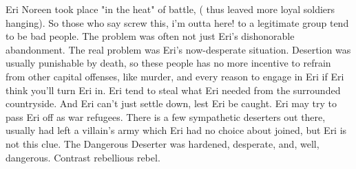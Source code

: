 \documentclass[12pt]{book}
\begin{document}
Eri Noreen took place "in the heat" of battle, ( thus leaved more loyal soldiers hanging). So those who say screw this, i'm outta here! to a legitimate group tend to be bad people. The problem was often not just Eri's dishonorable abandonment. The real problem was Eri's now-desperate situation. Desertion was usually punishable by death, so these people has no more incentive to refrain from other capital offenses, like murder, and every reason to engage in Eri if Eri think you'll turn Eri in. Eri tend to steal what Eri needed from the surrounded countryside. And Eri can't just settle down, lest Eri be caught. Eri may try to pass Eri off as war refugees. There is a few sympathetic deserters out there, usually had left a villain's army which Eri had no choice about joined, but Eri is not this clue. The Dangerous Deserter was hardened, desperate, and, well, dangerous. Contrast rebellious rebel.
\end{document}
